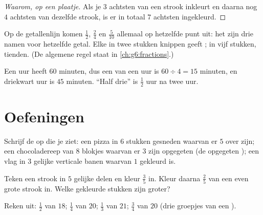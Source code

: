 \begin{proof}[Waarom, op een plaatje]
Als je $3$ achtsten van een strook inkleurt en daarna nog $4$ achtsten van
dezelfde strook, is er in totaal $7$ achtsten ingekleurd.
\end{proof}

\begin{example}\label{ex:g4:fractions:equal}
Op de getallenlijn komen $\frac12$, $\frac24$ en $\frac{5}{10}$ allemaal
op hetzelfde punt uit: het zijn drie namen voor hetzelfde getal. Elke 
in twee stukken knippen geeft ; in vijf stukken, tienden. (De
algemene regel staat in \cref{ch:g6:fractions}.)
\end{example}

\begin{example}[Kwartieren]\label{ex:g4:fractions:hour}
Een uur heeft $60$ minuten, dus een  van een uur is
$60 \div 4 = 15$ minuten, en driekwart uur is $45$ minuten. ``Half drie''
is $\frac12$ uur na twee uur.
\end{example}

\section{Oefeningen}

\begin{exercise}[$\star$]\label{exo:g4:fractions:1}
Schrijf de  op die je ziet: een pizza in $6$ stukken gesneden waarvan
er $5$ over zijn; een chocoladereep van $8$ blokjes waarvan er $3$ zijn
opgegeten (de opgegeten ); een vlag in $3$ gelijke verticale banen
waarvan $1$ gekleurd is.
\end{exercise}

\begin{exercise}[$\star$]\label{exo:g4:fractions:2}
Teken een strook in $5$ gelijke delen en kleur $\frac35$ in. Kleur daarna
$\frac{2}{5}$ van een even grote strook in. Welke gekleurde stukken zijn
groter?
\end{exercise}

\begin{exercise}[$\star$]\label{exo:g4:fractions:3}
Reken uit: $\frac12$ van $18$; \quad $\frac14$ van $20$; \quad
$\frac13$ van $21$; \quad $\frac34$ van $20$ (drie groepjes van een
).
\end{exercise}

